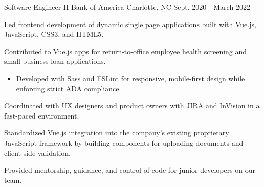 \begin{cventries}
\cventry
{Software Engineer II} %
{Bank of America} %
{Charlotte, NC} %
{Sept. 2020 - March 2022} %
{
  \begin{cvitems} %
    \item {Led frontend development of dynamic single page applications built with Vue.js, JavaScript, CSS3, and HTML5.}
    \item {Contributed to Vue.js apps for return-to-office employee health screening and small business loan applications.}
    \begin{itemize}[leftmargin=2.5ex]
      \vspace{.7mm}
      \item {Developed with Sass and ESLint for responsive, mobile-first design while enforcing strict ADA compliance.}
      \vspace{.5mm}
    \end{itemize}
    \item {Coordinated with UX designers and product owners with JIRA and InVision in a fast-paced environment.}
    \item {Standardized Vue.js integration into the company's existing proprietary JavaScript framework by building components for uploading documents and client-side validation.}
    \item {Provided mentorship, guidance, and control of code for junior developers on our team.}
  \end{cvitems}
}


\end{cventries}
